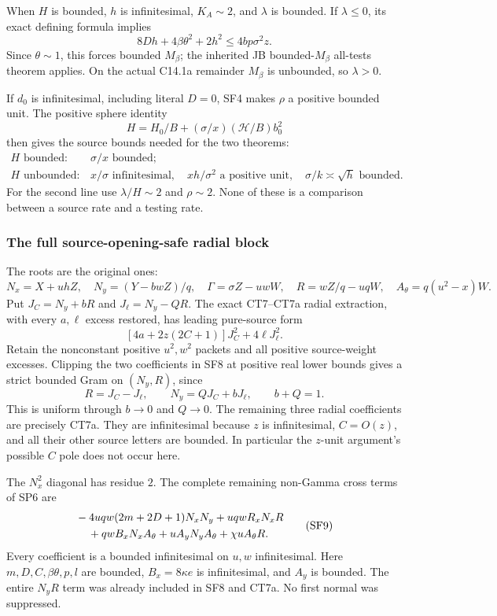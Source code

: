 When $H$ is bounded, $h$ is infinitesimal, $K_A\sim2$, and
$\lambda$ is bounded. If $\lambda\le0$, its exact defining formula
implies
\[
 8Dh+4\beta\theta^2+2h^2\le4bp\sigma^2z.
\]
Since $\theta\sim1$, this forces bounded $M_\beta$; the inherited
JB bounded-$M_\beta$ all-tests theorem applies. On the actual
C14.1a remainder $M_\beta$ is unbounded, so $\lambda>0$.

If $d_0$ is infinitesimal, including literal $D=0$, SF4 makes
$\rho$ a positive bounded unit. The positive sphere identity
\[
 H=H_0/B+(\sigma/x)(\mathcal H/B)b_0^2
 \tag{SF6}
\]
then gives the source bounds needed for the two theorems:
\[
 \begin{array}{ll}
 H\text{ bounded}:&\sigma/x\text{ bounded};\\
 H\text{ unbounded}:&x/\sigma\text{ infinitesimal},\quad
                    xh/\sigma^2\text{ a positive unit},\quad
                    \sigma/k\asymp\sqrt h\text{ bounded}.
 \end{array}
 \tag{SF7}
\]
For the second line use $\lambda/H\sim2$ and $\rho\sim2$.
None of these is a comparison between a source rate and a testing rate.

\subsubsection*{The full source-opening-safe radial block}

The roots are the original ones:
\[
 N_x=X+uhZ,\quad N_y=(Y-bwZ)/q,\quad
 \Gamma=\sigma Z-uwW,\quad R=wZ/q-uqW,\quad
 A_\theta=q(u^2-x)W.
\]
Put $J_C=N_y+bR$ and $J_\ell=N_y-QR$. The exact CT7--CT7a
radial extraction, with every $a,\ell$ excess restored, has leading
pure-source form
\[
 [4a+2z(2C+1)]J_C^2+4\ell J_\ell^2.
 \tag{SF8}
\]
Retain the nonconstant positive $u^2,w^2$ packets and all positive
source-weight excesses. Clipping the two coefficients in SF8 at
positive real lower bounds gives a strict bounded Gram on $(N_y,R)$,
since
\[
 R=J_C-J_\ell,\qquad N_y=QJ_C+bJ_\ell,
 \qquad b+Q=1.
\]
This is uniform through $b\to0$ and $Q\to0$. The remaining three
radial coefficients are precisely CT7a. They are infinitesimal
because $z$ is infinitesimal, $C=O(z)$, and all their other source
letters are bounded. In particular the $z$-unit argument's possible
$C$ pole does not occur here.

The $N_x^2$ diagonal has residue $2$. The complete remaining
non-Gamma cross terms of SP6 are
\[
 \begin{split}
 &-4uqw(2m+2D+1)N_xN_y+uqwR_xN_xR\\
 &\hspace{4mm}+qwB_xN_xA_\theta+uA_yN_yA_\theta
                         +\chi uA_\theta R.
 \end{split}
 \tag{SF9}
\]
Every coefficient is a bounded infinitesimal on $u,w$ infinitesimal.
Here $m,D,C,\beta\theta,p,l$ are bounded, $B_x=8\kappa e$ is
infinitesimal, and $A_y$ is bounded. The entire $N_yR$ term was
already included in SF8 and CT7a. No first normal was suppressed.

